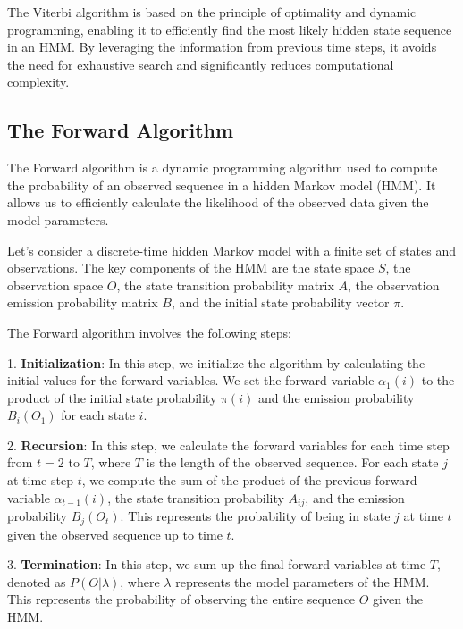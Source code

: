 \documentclass[a4paper,11pt]{article}
\begin{document}
The Viterbi algorithm is based on the principle of optimality and dynamic programming, enabling it to efficiently find the most likely hidden state sequence in an HMM. By leveraging the information from previous time steps, it avoids the need for exhaustive search and significantly reduces computational complexity.


\subsection{The Forward Algorithm}
\label{sec:forward}

The Forward algorithm is a dynamic programming algorithm used to compute the probability of an observed sequence in a hidden Markov model (HMM). It allows us to efficiently calculate the likelihood of the observed data given the model parameters.

Let's consider a discrete-time hidden Markov model with a finite set of states and observations. The key components of the HMM are the state space $S$, the observation space $O$, the state transition probability matrix $A$, the observation emission probability matrix $B$, and the initial state probability vector $\pi$.

The Forward algorithm involves the following steps:

1. \textbf{Initialization}: In this step, we initialize the algorithm by calculating the initial values for the forward variables. We set the forward variable $\alpha_1(i)$ to the product of the initial state probability $\pi(i)$ and the emission probability $B_{i}(O_1)$ for each state $i$.

2. \textbf{Recursion}: In this step, we calculate the forward variables for each time step from $t = 2$ to $T$, where $T$ is the length of the observed sequence. For each state $j$ at time step $t$, we compute the sum of the product of the previous forward variable $\alpha_{t-1}(i)$, the state transition probability $A_{ij}$, and the emission probability $B_{j}(O_t)$. This represents the probability of being in state $j$ at time $t$ given the observed sequence up to time $t$.

3. \textbf{Termination}: In this step, we sum up the final forward variables at time $T$, denoted as $P(O|\lambda)$, where $\lambda$ represents the model parameters of the HMM. This represents the probability of observing the entire sequence $O$ given the HMM.
\end{document}
